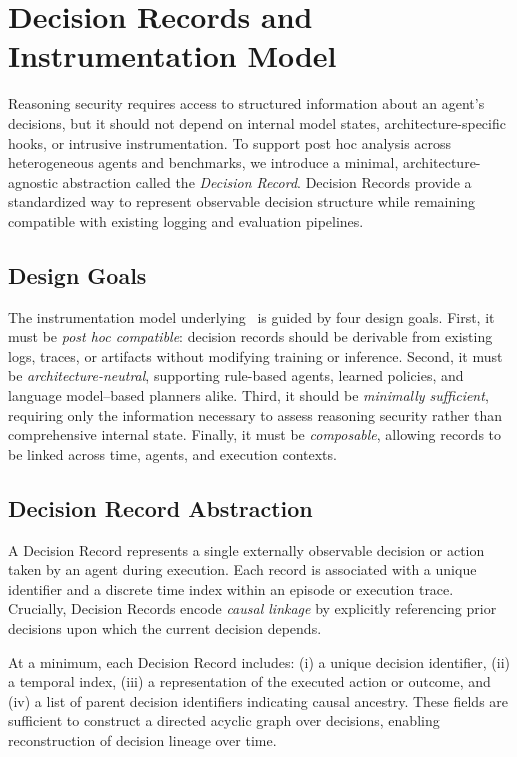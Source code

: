 \section{Decision Records and Instrumentation Model}
Reasoning security requires access to structured information about an agent’s decisions, but it should not depend on internal model states, architecture-specific hooks, or intrusive instrumentation. To support post hoc analysis across heterogeneous agents and benchmarks, we introduce a minimal, architecture-agnostic abstraction called the \emph{Decision Record}. Decision Records provide a standardized way to represent observable decision structure while remaining compatible with existing logging and evaluation pipelines.

\subsection{Design Goals}
The instrumentation model underlying \RSS\ is guided by four design goals. First, it must be \emph{post hoc compatible}: decision records should be derivable from existing logs, traces, or artifacts without modifying training or inference. Second, it must be \emph{architecture-neutral}, supporting rule-based agents, learned policies, and language model--based planners alike. Third, it should be \emph{minimally sufficient}, requiring only the information necessary to assess reasoning security rather than comprehensive internal state. Finally, it must be \emph{composable}, allowing records to be linked across time, agents, and execution contexts.

\subsection{Decision Record Abstraction}
A Decision Record represents a single externally observable decision or action taken by an agent during execution. Each record is associated with a unique identifier and a discrete time index within an episode or execution trace. Crucially, Decision Records encode \emph{causal linkage} by explicitly referencing prior decisions upon which the current decision depends.

At a minimum, each Decision Record includes: (i) a unique decision identifier, (ii) a temporal index, (iii) a representation of the executed action or outcome, and (iv) a list of parent decision identifiers indicating causal ancestry. These fields are sufficient to construct a directed acyclic graph over decisions, enabling reconstruction of decision lineage over time.

